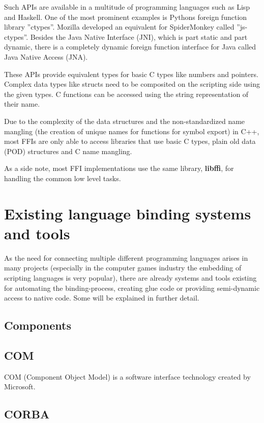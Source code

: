 Such APIs are available in a multitude of programming languages such as Lisp and Haskell. One of the most prominent examples is Pythons foreign function library ''ctypes''. Mozilla developed an equivalent for SpiderMonkey called ''js-ctypes''. Besides the Java Native Interface (JNI), which is part static and part dynamic, there is a completely dynamic foreign function interface for Java called Java Native Access (JNA). 

These APIs provide equivalent types for basic C types like numbers and pointers. Complex data types like structs need to be composited on the scripting side using the given types. C functions can be accessed using the string representation of their name.


Due to the complexity of the data structures and the non-standardized name mangling (the creation of unique names for functions for symbol export) in C++, most FFIs are only able to access libraries that use basic C types, plain old data (POD) structures and C name mangling.

As a side note, most FFI implementations use the same library, \textbf{libffi}, for handling the common low level tasks.

\section{Existing language binding systems and tools}

As the need for connecting multiple different programming languages arises in many projects (especially in the computer games industry the embedding of scripting languages is very popular), there are already systems and tools existing for automating the binding-process, creating glue code or providing semi-dynamic access to native code. Some will be explained in further detail.

\subsection{Components}

\subsection{COM}

COM (Component Object Model) is a software interface technology created by Microsoft.

\subsection{CORBA}

